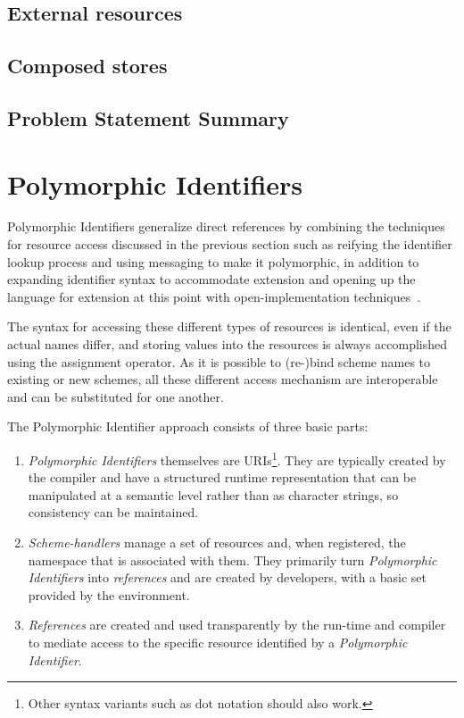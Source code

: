 \documentclass[preprint]{sigplanconf}
\begin{document}
\subsection{External resources}




\subsection{Composed stores}


\subsection{Problem Statement Summary}




\section{Polymorphic Identifiers}
\label{polymorphic-identifiers}

Polymorphic Identifiers generalize direct references by combining the techniques for resource access
discussed in the previous section such as reifying the identifier lookup process and using messaging 
to make it polymorphic, in addition to expanding identifier syntax to accommodate extension and 
opening up the language for extension at this point  with open-implementation techniques~\cite{OpenImplementations}.




The syntax for accessing these different types of resources is identical, even if the actual
names differ, and storing values into the resources is always accomplished using the assignment operator.
As it is possible to (re-)bind scheme names to existing or new schemes, all these different access 
mechanism are interoperable and can be substituted for one another.

The Polymorphic Identifier approach consists of three basic parts:
\begin{enumerate}
\item \emph{Polymorphic Identifiers} themselves are URIs\footnote{Other syntax variants such as dot notation should also work.}.
	  They are typically created by the 
	compiler and have a structured runtime representation that can be manipulated
	at a semantic level rather than as character strings, so consistency can be 
	maintained.
\item \emph{Scheme-handlers} manage a set of resources and, when registered,
	 the namespace that is associated
	with them.  They primarily turn \emph{Polymorphic Identifiers} into \emph{references} and
	are created by developers, with a basic set provided by the environment.
\item \emph{References} are created and used transparently by the run-time and compiler
	to mediate access to the specific resource identified by a \emph{Polymorphic Identifier}.
	
	
\end{enumerate}
\end{document}
